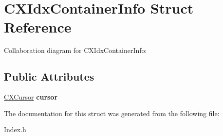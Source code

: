 \hypertarget{structCXIdxContainerInfo}{}\section{C\+X\+Idx\+Container\+Info Struct Reference}
\label{structCXIdxContainerInfo}


Collaboration diagram for C\+X\+Idx\+Container\+Info\+:
\subsection*{Public Attributes}
\begin{DoxyCompactItemize}
\item 
\mbox{\label{structCXIdxContainerInfo_a737858b5e1e72389926828bb6916c202}} 
\hyperlink{structCXCursor}{C\+X\+Cursor} {\bfseries cursor}
\end{DoxyCompactItemize}


The documentation for this struct was generated from the following file\+:\begin{DoxyCompactItemize}
\item 
Index.\+h\end{DoxyCompactItemize}
